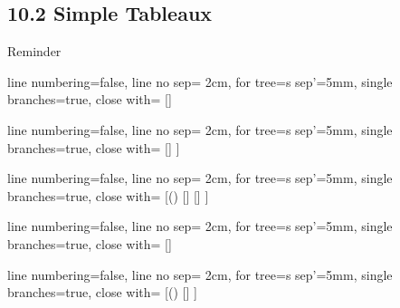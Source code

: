 \documentclass[../slides.tex]{subfiles}
\begin{document}
\subsection{10.2 Simple Tableaux}

\begin{frame}{Reminder}

		
			\begin{center}		
					\begin{prooftree}
					{
					line numbering=false,
					line no sep= 2cm,
					for tree={s sep'=5mm},
					single branches=true,
					close with=\xmark
					}
					[\neg\neg \phi [\phi ] ]
					\end{prooftree}
					\begin{prooftree}
					{
					line numbering=false,
					line no sep= 2cm,
					for tree={s sep'=5mm},
					single branches=true,
					close with=\xmark
					}
					[\phi\land\psi [\phi [\psi ] ] ]
					\end{prooftree}
					\begin{prooftree}
					{
					line numbering=false,
					line no sep= 2cm,
					for tree={s sep'=5mm},
					single branches=true,
					close with=\xmark
					}
					[\neg (\phi\land\psi) [\neg \phi ] [\neg \psi ] ]
					\end{prooftree}
					\begin{prooftree}
					{
					line numbering=false,
					line no sep= 2cm,
					for tree={s sep'=5mm},
					single branches=true,
					close with=\xmark
					}
					[\phi\lor\psi [\phi ] [\psi ] ]
					\end{prooftree}
					\begin{prooftree}
					{
					line numbering=false,
					line no sep= 2cm,
					for tree={s sep'=5mm},
					single branches=true,
					close with=\xmark
					}
					[\neg(\phi\lor\psi) [\neg\phi [\neg\psi ] ] ]
					\end{prooftree}

					\vspace{2ex}


\end{center}
\end{frame}
\end{document}
